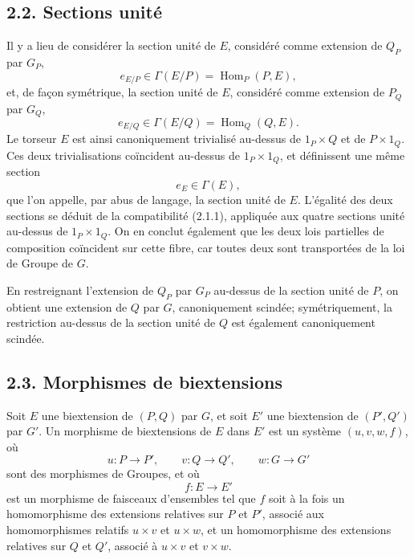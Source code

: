 \documentclass[11pt]{article}
\begin{document}
\subsection*{2.2. Sections unité}
Il y a lieu de considérer la section unité de \(E\), considéré comme extension de \(Q_P\) par \(G_P\),
\begin{equation}\tag{2.2.1}
  e_{E/P}\in\Gamma(E/P)=\operatorname{Hom}_P(P,E),
\end{equation}
et, de façon symétrique, la section unité de \(E\), considéré comme extension de \(P_Q\) par \(G_Q\),
\begin{equation}\tag{2.2.2}
  e_{E/Q}\in\Gamma(E/Q)=\operatorname{Hom}_Q(Q,E).
\end{equation}
Le torseur \(E\) est ainsi canoniquement trivialisé au-dessus de \(1_P\times Q\) et de \(P\times1_Q\).  Ces deux trivialisations coïncident au-dessus de \(1_P\times1_Q\), et définissent une même section
\begin{equation}\tag{2.2.3}
  e_E\in\Gamma(E),
\end{equation}
que l'on appelle, par abus de langage, la section unité de \(E\).  L'égalité des deux sections se déduit de la compatibilité (2.1.1), appliquée aux quatre sections unité au-dessus de \(1_P\times1_Q\).  On en conclut également que les deux lois partielles de composition coïncident sur cette fibre, car toutes deux sont transportées de la loi de Groupe de \(G\).

En restreignant l'extension de \(Q_P\) par \(G_P\) au-dessus de la section unité de \(P\), on obtient une extension de \(Q\) par \(G\), canoniquement scindée; symétriquement, la restriction au-dessus de la section unité de \(Q\) est également canoniquement scindée.

\subsection*{2.3. Morphismes de biextensions}
Soit \(E\) une biextension de \((P,Q)\) par \(G\), et soit \(E'\) une biextension de \((P',Q')\) par \(G'\).  Un morphisme de biextensions de \(E\) dans \(E'\) est un système \((u,v,w,f)\), où
\begin{equation}\tag{2.3.1}
  u:P\to P',\qquad v:Q\to Q',\qquad w:G\to G'
\end{equation}
sont des morphismes de Groupes, et où
\begin{equation}\tag{2.3.2}
  f:E\to E'
\end{equation}
est un morphisme de faisceaux d'ensembles tel que \(f\) soit à la fois un homomorphisme des extensions relatives sur \(P\) et \(P'\), associé aux homomorphismes relatifs \(u\times v\) et \(u\times w\), et un homomorphisme des extensions relatives sur \(Q\) et \(Q'\), associé à \(u\times v\) et \(v\times w\).
\end{document}
